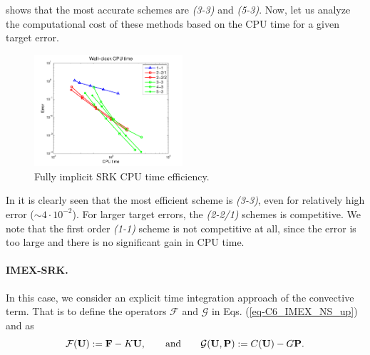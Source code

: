 
 shows that the most accurate schemes are \textit{(3-3)} and \textit{(5-3)}. Now, let us analyze the computational cost of these methods based on the CPU time for a given target error. %
\begin{figure}[h!]
  \centering
  \includegraphics[width=0.49\textwidth]{Figures/Chapter6/cylinder/Efficiency}  
  \caption{Fully implicit SRK CPU time efficiency.}
  \label{fig-IMEX_RK_cyl_effi}
\end{figure}
In  it is clearly seen that the most efficient scheme is \textit{(3-3)}, even for relatively high error ($\sim4\cdot10^{-2}$). For larger target errors, the \textit{(2-2/1)} schemes is competitive. We note that the first order \textit{(1-1)} scheme is not competitive at all, since the error is too large and there is no significant gain in CPU time. %

\paragraph{IMEX-SRK.}

In this case, we consider an explicit time integration approach of the convective term. That is to define the operators $\mathcal{F}$ and $\mathcal{G}$ in  Eqs. (\ref{eq-C6_IMEX_NS_up}) and  as
$$\mathcal{F}({\bf U}):={\bf F}-K{\bf U},\quad\quad\mbox{and}\quad\quad\mathcal{G}({\bf U},{\bf P}):=C({\bf U})-G{\bf P}.$$

